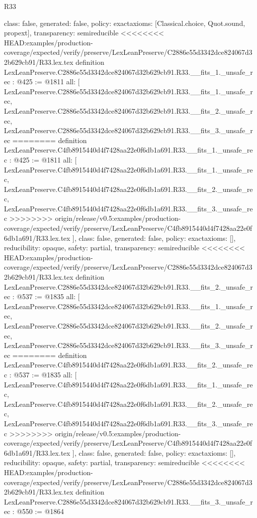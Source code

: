 \begin{lexlean}{R33}
\begin{coremodule}
{{{{{{{{{{{{{{{  class: false,
  generated: false,
  policy: exact{axioms: [Classical.choice, Quot.sound, propext]},
  transparency: semireducible
}
<<<<<<<< HEAD:examples/production-coverage/expected/verify/preserve/LexLeanPreserve/C2886e55d3342dce824067d32b629cb91/R33.lex.tex
definition LexLeanPreserve.C2886e55d3342dce824067d32b629cb91.R33.__fits_1._unsafe_rec : @425 := @1811 {
  all: [
    LexLeanPreserve.C2886e55d3342dce824067d32b629cb91.R33.__fits_1._unsafe_rec,
    LexLeanPreserve.C2886e55d3342dce824067d32b629cb91.R33.__fits_2._unsafe_rec,
    LexLeanPreserve.C2886e55d3342dce824067d32b629cb91.R33.__fits_3._unsafe_rec
========
definition LexLeanPreserve.C4fb8915440d4f7428aa22e0f6db1a691.R33.__fits_1._unsafe_rec : @425 := @1811 {
  all: [
    LexLeanPreserve.C4fb8915440d4f7428aa22e0f6db1a691.R33.__fits_1._unsafe_rec,
    LexLeanPreserve.C4fb8915440d4f7428aa22e0f6db1a691.R33.__fits_2._unsafe_rec,
    LexLeanPreserve.C4fb8915440d4f7428aa22e0f6db1a691.R33.__fits_3._unsafe_rec
>>>>>>>> origin/release/v0.5:examples/production-coverage/expected/verify/preserve/LexLeanPreserve/C4fb8915440d4f7428aa22e0f6db1a691/R33.lex.tex
  ],
  class: false,
  generated: false,
  policy: exact{axioms: []},
  reducibility: opaque{},
  safety: partial,
  transparency: semireducible
}
<<<<<<<< HEAD:examples/production-coverage/expected/verify/preserve/LexLeanPreserve/C2886e55d3342dce824067d32b629cb91/R33.lex.tex
definition LexLeanPreserve.C2886e55d3342dce824067d32b629cb91.R33.__fits_2._unsafe_rec : @537 := @1835 {
  all: [
    LexLeanPreserve.C2886e55d3342dce824067d32b629cb91.R33.__fits_1._unsafe_rec,
    LexLeanPreserve.C2886e55d3342dce824067d32b629cb91.R33.__fits_2._unsafe_rec,
    LexLeanPreserve.C2886e55d3342dce824067d32b629cb91.R33.__fits_3._unsafe_rec
========
definition LexLeanPreserve.C4fb8915440d4f7428aa22e0f6db1a691.R33.__fits_2._unsafe_rec : @537 := @1835 {
  all: [
    LexLeanPreserve.C4fb8915440d4f7428aa22e0f6db1a691.R33.__fits_1._unsafe_rec,
    LexLeanPreserve.C4fb8915440d4f7428aa22e0f6db1a691.R33.__fits_2._unsafe_rec,
    LexLeanPreserve.C4fb8915440d4f7428aa22e0f6db1a691.R33.__fits_3._unsafe_rec
>>>>>>>> origin/release/v0.5:examples/production-coverage/expected/verify/preserve/LexLeanPreserve/C4fb8915440d4f7428aa22e0f6db1a691/R33.lex.tex
  ],
  class: false,
  generated: false,
  policy: exact{axioms: []},
  reducibility: opaque{},
  safety: partial,
  transparency: semireducible
}
<<<<<<<< HEAD:examples/production-coverage/expected/verify/preserve/LexLeanPreserve/C2886e55d3342dce824067d32b629cb91/R33.lex.tex
definition LexLeanPreserve.C2886e55d3342dce824067d32b629cb91.R33.__fits_3._unsafe_rec : @550 := @1864 {
}}}}}}}}}}}}}}}}}
\end{coremodule}
\end{lexlean}
